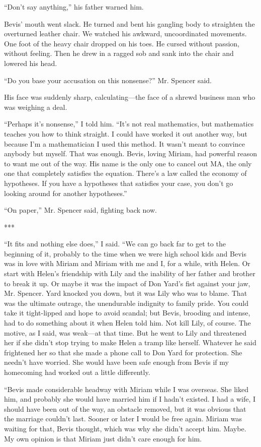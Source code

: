 \documentclass{novel}
\begin{document}
“Don’t say anything,” his father warned him.

Bevis’ mouth went slack. He turned and bent his gangling body to straighten the overturned leather chair. We watched his awkward, uncoordinated movements. One foot of the heavy chair dropped on his toes. He cursed without passion, without feeling. Then he drew in a ragged sob and sank into the chair and lowered his head.

“Do you base your accusation on this nonsense?” Mr. Spencer said.

His face was suddenly sharp, calculating—the face of a shrewd business man who was weighing a deal.

“Perhaps it’s nonsense,” I told him. “It’s not real mathematics, but mathematics teaches you how to think straight. I could have worked it out another way, but because I’m a mathematician I used this method. It wasn’t meant to convince anybody but myself. That was enough. Bevis, loving Miriam, had powerful reason to want me out of the way. His name is the only one to cancel out MA, the only one that completely satisfies the equation. There’s a law called the economy of hypotheses. If you have a hypotheses that satisfies your case, you don’t go looking around for another hypotheses.”

“On paper,” Mr. Spencer said, fighting back now.

***

“It fits and nothing else does,” I said. “We can go back far to get to the beginning of it, probably to the time when we were high school kids and Bevis was in love with Miriam and Miriam with me and I, for a while, with Helen. Or start with Helen’s friendship with Lily and the inability of her father and brother to break it up. Or maybe it was the impact of Don Yard’s fist against your jaw, Mr. Spencer. Yard knocked you down, but it was Lily who was to blame. That was the ultimate outrage, the unendurable indignity to family pride. You could take it tight-lipped and hope to avoid scandal; but Bevis, brooding and intense, had to do something about it when Helen told him. Not kill Lily, of course. The motive, as I said, was weak—at that time. But he went to Lily and threatened her if she didn’t stop trying to make Helen a tramp like herself. Whatever he said frightened her so that she made a phone call to Don Yard for protection. She needn’t have worried. She would have been safe enough from Bevis if my homecoming had worked out a little differently.

“Bevis made considerable headway with Miriam while I was overseas. She liked him, and probably she would have married him if I hadn’t existed. I had a wife, I should have been out of the way, an obstacle removed, but it was obvious that the marriage couldn’t last. Sooner or later I would be free again. Miriam was waiting for that, Bevis thought, which was why she didn’t accept him. Maybe. My own opinion is that Miriam just didn’t care enough for him.
\end{document}
